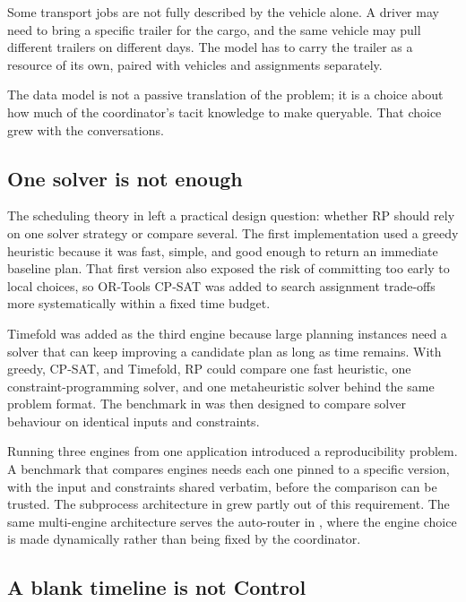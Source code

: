 Some transport jobs are not fully described by the vehicle alone. A driver may need to bring a specific trailer for the cargo, and the same vehicle may pull different trailers on different days. The model has to carry the trailer as a resource of its own, paired with vehicles and assignments separately.

The data model is not a passive translation of the problem; it is a choice about how much of the coordinator's tacit knowledge to make queryable. That choice grew with the conversations.

\subsection{One solver is not enough}
\label{sec:solver-layer}

The scheduling theory in  left a practical design question: whether RP should rely on one solver strategy or compare several. The first implementation used a greedy heuristic because it was fast, simple, and good enough to return an immediate baseline plan. That first version also exposed the risk of committing too early to local choices, so OR-Tools CP-SAT was added to search assignment trade-offs more systematically within a fixed time budget.

Timefold was added as the third engine because large planning instances need a solver that can keep improving a candidate plan as long as time remains. With greedy, CP-SAT, and Timefold, RP could compare one fast heuristic, one constraint-programming solver, and one metaheuristic solver behind the same problem format. The benchmark in  was then designed to compare solver behaviour on identical inputs and constraints.

Running three engines from one application introduced a reproducibility problem. A benchmark that compares engines needs each one pinned to a specific version, with the input and constraints shared verbatim, before the comparison can be trusted. The subprocess architecture in  grew partly out of this requirement. The same multi-engine architecture serves the auto-router in , where the engine choice is made dynamically rather than being fixed by the coordinator.

\subsection{A blank timeline is not Control}
\label{sec:hitl-deviations}

